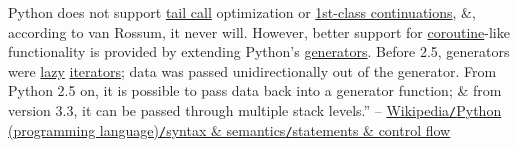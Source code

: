 \documentclass{article}
\numberwithin{equation}{section}
\begin{document}
Python does not support \href{https://en.wikipedia.org/wiki/Tail_call}{tail call} optimization or \href{https://en.wikipedia.org/wiki/First-class_continuations}{1st-class continuations}, \&, according to van Rossum, it never will. However, better support for \href{https://en.wikipedia.org/wiki/Coroutine}{coroutine}-like functionality is provided by extending Python's \href{https://en.wikipedia.org/wiki/Generator_(computer_programming)}{generators}. Before 2.5, generators were \href{https://en.wikipedia.org/wiki/Lazy_evaluation}{lazy} \href{https://en.wikipedia.org/wiki/Iterator}{iterators}; data was passed unidirectionally out of the generator. From Python 2.5 on, it is possible to pass data back into a generator function; \& from version 3.3, it can be passed through multiple stack levels.'' -- \href{https://en.wikipedia.org/wiki/Python_(programming_language)#Statements_and_control_flow}{Wikipedia\texttt{/}Python (programming language)\texttt{/}syntax \& semantics\texttt{/}statements \& control flow}
\end{document}
